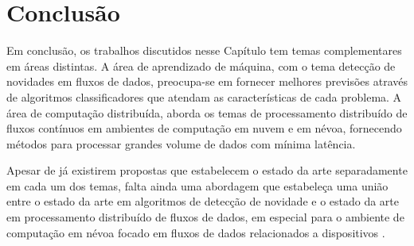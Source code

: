 \section{Conclusão}\label{sec:conclusao-relacionados}


Em conclusão, os trabalhos discutidos nesse Capítulo tem temas complementares em
áreas distintas.
A área de aprendizado de máquina, com o tema detecção de novidades em fluxos de
dados, preocupa-se em fornecer melhores previsões através de algoritmos
classificadores que atendam as características de cada problema.
A área de computação distribuída, aborda os temas de processamento distribuído
de fluxos contínuos em ambientes de computação em nuvem e em névoa, fornecendo
métodos para processar grandes volume de dados com mínima latência.

Apesar de já existirem propostas que estabelecem o estado da arte separadamente
em cada um dos temas, falta ainda uma abordagem que estabeleça uma união entre o
estado da arte em algoritmos de detecção de novidade e o estado da arte em
processamento distribuído de fluxos de dados, em especial para o ambiente de
computação em névoa focado em fluxos de dados relacionados a dispositivos \iot.
